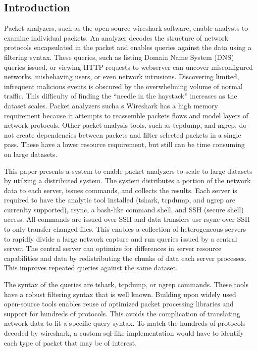 \documentclass{article}
\begin{document}
\begin{multicols}{2}
  
\section{Introduction} %

Packet analyzers, such as the open source wireshark software, enable analysts to examine individual packets.  An analyzer decodes the structure of network protocols encapsulated in the packet and enables queries against the data using a filtering syntax.  These queries, such as listing Domain Name System (DNS) queries issued, or viewing HTTP requests to webserver can uncover misconfigured networks, misbehaving users, or even network intrusions. Discovering limited, infrequent malicious events is obscured by the overwhelming volume of normal traffic. This difficulty of finding the ``needle in the haystack'' increases as the dataset scales.  Packet analyzers sucha s Wireshark has a high memory requirement because it attempts to reassemble packets flows and model layers of network protocols.  Other packet analysis tools, such as tcpdump, and ngrep, do not create dependencies between packets and filter selected packets in a single pass. These have a lower resource requirement, but still can be time consuming on large datasets. 

This paper presents a system to enable packet analyzers to scale to large datasets by utilzing a distributed system. The system distributes a portion of the network data to each server, issues commands, and collects the results. Each server is required to have the analytic tool installed (tshark, tcpdump, and ngrep are currenlty supported), rsync, a bash-like command shell, and SSH (secure shell) access.  All commands are issued over SSH and data transfers use rsync over SSH to only transfer changed files.  This enables a collection of heterogeneous servers to rapidly divide a large network capture and run queries issued by a central server.  The central server can optimize for differences in server resource capabilities and data by redistributing the chunks of data each server processes.  This improves repeated queries against the same dataset. 

The syntax of the queries are tshark, tcpdump, or ngrep commands.  These tools have a robust filtering syntax that is well known.  Building upon widely used open-source tools enables reuse of optimized packet processing libraries and support for hundreds of protocols.  This avoids the complication of translating network data to fit a specific query syntax.  To match the hundreds of protocols decoded by wireshark, a custom sql-like implementation would have to identify each type of packet that may be of interest.


\end{multicols}
\end{document}
